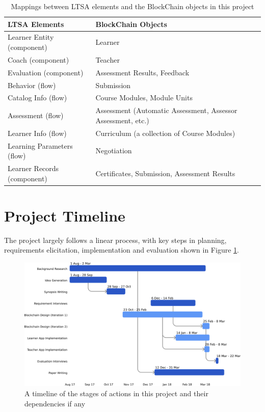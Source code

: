 \begin{table}[!h] 
    \caption{Mappings between LTSA elements and the BlockChain objects in this project}
    \centering
    \label{table:ltsa-bcu}
    \begin{tabularx}{\textwidth}{l|X}
        \textbf{LTSA Elements} & \textbf{BlockChain Objects}
        \\\toprule
        Learner Entity (component) & Learner
        \\\midrule
        Coach (component) & Teacher
        \\\midrule
        Evaluation (component) & Assessment Results, Feedback
        \\\midrule
        Behavior (flow) & Submission
        \\\midrule
        Catalog Info (flow) & Course Modules, Module Units
        \\\midrule
        Assessment (flow) & Assessment (Automatic Assessment, Assessor Assessment, etc.)
        \\\midrule
        Learner Info (flow) & Curriculum (a collection of Course Modules)
        \\\midrule
        Learning Parameters (flow) & Negotiation
        \\\midrule
        Learner Records (component) & Certificates, Submission, Assessment Results
        \\\bottomrule
    \end{tabularx}
\end{table}

\section{Project Timeline}

The project largely follows a linear process, with key steps in planning, requirements elicitation, 
implementation and evaluation shown in Figure \ref{fig:simple_gantt}.

\begin{figure}[!ht]
    \centering
    \includegraphics[width=1.0\textwidth]{simple_gantt}
    \caption[Project Timeline]
        {A timeline of the stages of actions in this project and their dependencies if any}
    \label{fig:simple_gantt}
\end{figure}

